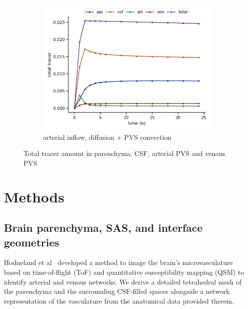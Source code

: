 \documentclass[fleqn,10pt]{wlscirep}
\newcommand{\mer}[1]{\textcolor{magenta}{#1}}
\begin{document}
\begin{figure}
\begin{subfigure}[b]{0.33\textwidth}
         \centering
         \includegraphics[width=\textwidth]{modelC_total_conc.png}
         \caption{arterial inflow, diffusion + PVS convection}
         \label{fig:five over x}
     \end{subfigure}
        \caption{Total tracer amount in parenchyma, CSF, arterial PVS and venous PVS}
        \label{fig:three graphs}
\end{figure}

\fi

\newpage
\section*{Methods}


\subsection*{Brain parenchyma, SAS, and interface geometries}


Hodneland et al~\cite{hodneland2019new} developed a method to image
the brain's microvasculature based on time-of-flight (ToF) and
quantitative susceptibility mapping (QSM) to identify arterial and
venous networks.  We derive a detailed tetrahedral mesh of the
parenchyma and the surrounding CSF-filled spaces alongside a network
representation of the vasculature from the anatomical data provided
therein. 
\end{document}

